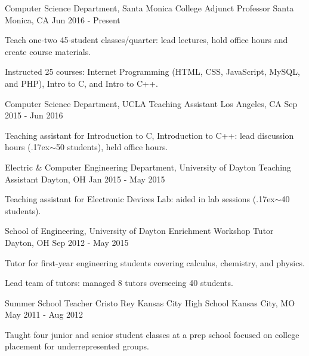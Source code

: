 


\begin{cventries}

\cventry
{Computer Science Department, Santa Monica College}
{Adjunct Professor}
{Santa Monica, CA}
{Jun 2016 - Present}
{
\begin{cvitems}
  \item Teach one-two 45-student classes/quarter: lead lectures, hold office hours and create course materials.
  \item Instructed 25 courses: Internet Programming (HTML, CSS, JavaScript, MySQL, and PHP), Intro to C, and Intro to C++.
\end{cvitems}
}


\cventry
{Computer Science Department, UCLA}
{Teaching Assistant}
{Los Angeles, CA}
{Sep 2015 - Jun 2016}
{
\begin{cvitems}
  \item Teaching assistant for Introduction to C, Introduction to C++: lead discussion hours ({\raise.17ex\hbox{$\scriptstyle\sim$}}50 students), held office hours.
\end{cvitems}
}

\cventry
{Electric \& Computer Engineering Department, University of Dayton}
{Teaching Assistant}
{Dayton, OH}
{Jan 2015 - May 2015}
{
\begin{cvitems}
  \item Teaching assistant for Electronic Devices Lab: aided in lab sessions ({\raise.17ex\hbox{$\scriptstyle\sim$}}40 students).
\end{cvitems}
}

\cventry
{School of Engineering, University of Dayton}
{Enrichment Workshop Tutor}
{Dayton, OH}
{Sep 2012 - May 2015}
{
\begin{cvitems}
  \item Tutor for first-year engineering students covering calculus, chemistry, and physics.
  \item Lead team of tutors: managed 8 tutors overseeing 40 students.
\end{cvitems}
}


\cventry
{Summer School Teacher}
{Cristo Rey Kansas City High School}
{Kansas City, MO}
{May 2011 - Aug 2012}
{
\begin{cvitems}
\item Taught four junior and senior student classes at a prep school focused on college placement for underrepresented groups.
\end{cvitems}
}

\end{cventries}